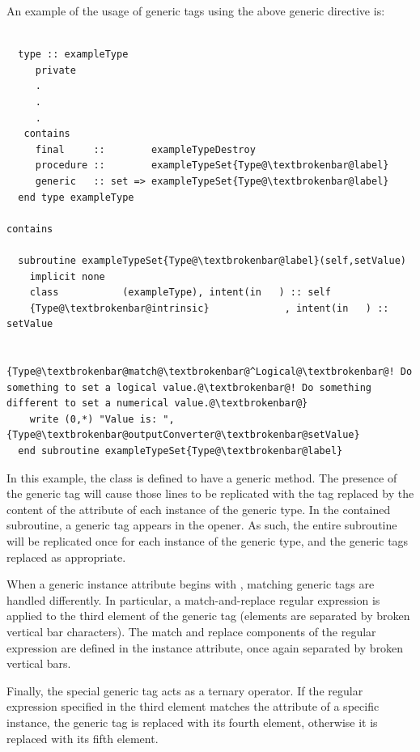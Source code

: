 An example of the usage of generic tags using the above generic directive is:
\lstset{escapechar=@}
\begin{lstlisting}

  type :: exampleType
     private
     .
     .
     .
   contains
     final     ::        exampleTypeDestroy
     procedure ::        exampleTypeSet{Type@\textbrokenbar@label}
     generic   :: set => exampleTypeSet{Type@\textbrokenbar@label}
  end type exampleType

contains

  subroutine exampleTypeSet{Type@\textbrokenbar@label}(self,setValue)
    implicit none
    class           (exampleType), intent(in   ) :: self
    {Type@\textbrokenbar@intrinsic}             , intent(in   ) :: setValue

    {Type@\textbrokenbar@match@\textbrokenbar@^Logical@\textbrokenbar@! Do something to set a logical value.@\textbrokenbar@! Do something different to set a numerical value.@\textbrokenbar@}
    write (0,*) "Value is: ",{Type@\textbrokenbar@outputConverter@\textbrokenbar@setValue}
  end subroutine exampleTypeSet{Type@\textbrokenbar@label}
\end{lstlisting}

In this example, the  class is defined to have a generic  method. The presence of the  generic tag will cause those lines to be replicated with the tag replaced by the content of the  attribute of each instance of the generic type. In the contained subroutine, a generic tag appears in the opener. As such, the entire subroutine will be replicated once for each instance of the generic type, and the generic tags replaced as appropriate.

When a generic instance attribute begins with , matching generic tags are handled differently. In particular, a match-and-replace regular expression is applied to the third element of the generic tag (elements are separated by broken vertical bar characters). The match and replace components of the regular expression are defined in the instance attribute, once again separated by broken vertical bars.

Finally, the special generic tag  acts as a ternary operator. If the regular expression specified in the third element matches the  attribute of a specific instance, the generic tag is replaced with its fourth element, otherwise it is replaced with its fifth element.


